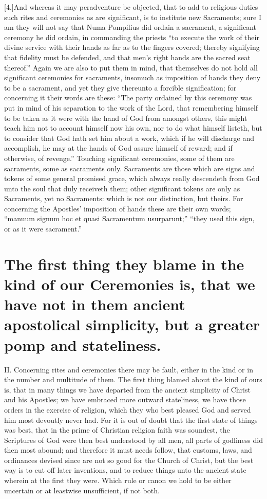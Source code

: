 [4.]And whereas it may peradventure be objected, that to add to religious duties such rites and ceremonies as are significant, is to institute new Sacraments; sure I am they will not say that Numa Pompilius did ordain a sacrament, a significant ceremony he did ordain, in commanding the priests “to execute the work of their divine service with their hands as far as to the fingers covered; thereby signifying that fidelity must be defended, and that men’s right hands are the sacred seat thereof.” Again we are also to put them in mind, that themselves do not hold all significant ceremonies for sacraments, insomuch as imposition of hands they deny to be a sacrament, and yet they give thereunto a forcible signification; for concerning it their words are these: “The party ordained by this ceremony was put in mind of his separation to the work of the Lord, that remembering himself to be taken as it were with the hand of God from amongst others, this might teach him not to account himself now his own, nor to do what himself listeth, but to consider that God hath set him about a work, which if he will discharge and accomplish, he may at the hands of God assure himself of reward; and if otherwise, of revenge.” Touching significant ceremonies,  some of them are sacraments, some as sacraments only. Sacraments are those which are signs and tokens of some general promised grace, which always really descendeth from God unto the soul that duly receiveth them; other significant tokens are only as Sacraments, yet no Sacraments: which is not our distinction, but theirs. For concerning the Apostles’ imposition of hands these are their own words; “manuum signum hoc et quasi Sacramentum usurparunt;” “they used this sign, or as it were sacrament.”

\section*{The first thing they blame in the kind of our Ceremonies is, that we have not in them ancient apostolical simplicity, but a greater pomp and stateliness.}

II. Concerning rites and ceremonies there may be fault, either in the kind or in the number and multitude of them. The first thing blamed about the kind of ours is, that in many things we have departed from the ancient simplicity of Christ and his Apostles; we have embraced more outward stateliness, we have those orders in the exercise of religion, which they who best pleased God and served him most devoutly never had. For it is out of doubt that the first state of things was best, that in the prime of Christian religion faith was soundest, the Scriptures of God were then best understood by all men, all parts of godliness did then most abound; and therefore it must needs follow, that customs, laws, and ordinances devised since are not so good for the Church of Christ, but the best way is to cut off later inventions, and to reduce things unto the ancient state wherein at the first they were. Which rule or canon we hold to be either uncertain or at leastwise unsufficient, if not both.

